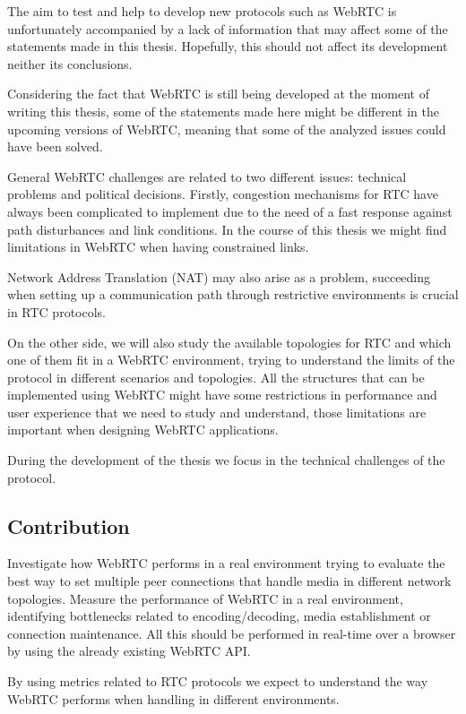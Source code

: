 The aim to test and help to develop new protocols such as WebRTC is unfortunately accompanied by a lack of information that may affect some of the statements made in this thesis. Hopefully, this should not affect its development neither its conclusions.

Considering the fact that WebRTC is still being developed at the moment of writing this thesis, some of the statements made here might be different in the upcoming versions of WebRTC, meaning that some of the analyzed issues could have been solved.

General WebRTC challenges are related to two different issues: technical problems and political decisions. Firstly, congestion mechanisms for RTC have always been  complicated to implement due to the need of a fast response against path disturbances and link conditions. In the course of this thesis we might find limitations in WebRTC when having constrained links.

Network Address Translation (NAT)  may also arise as a problem, succeeding when setting up a communication path through restrictive environments is crucial in RTC protocols.

On the other side, we will also study the available topologies for RTC and which one of them fit in a WebRTC environment, trying to understand the limits of the protocol in different scenarios and topologies. All the structures that can be implemented using WebRTC might have some restrictions in performance and user experience that we need to study and understand, those limitations are important when designing WebRTC applications.

During the development of the thesis we focus in the technical challenges of the protocol.

\subsection{Contribution}

Investigate how WebRTC performs in a real environment trying to evaluate the best way to set multiple peer connections that handle media in different network topologies. Measure the performance of WebRTC in a real environment, identifying bottlenecks related to encoding/decoding, media establishment or connection maintenance. All this should be performed in real-time over a browser by using the already existing WebRTC API.

By using metrics related to RTC protocols we expect to understand the way WebRTC performs when handling in different environments.

